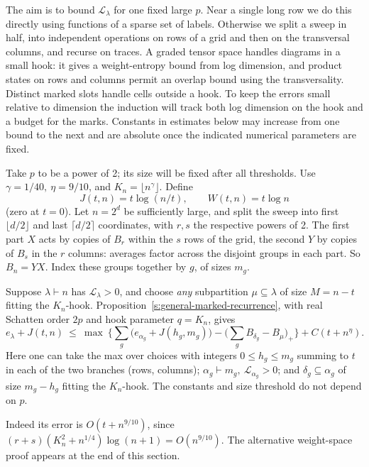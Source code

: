 The aim is to bound \(\mathcal L_\lambda\) for one fixed large \(p\). Near a single long row we do this directly using functions of a sparse set of labels. Otherwise we split a sweep in half, into independent operations on rows of a grid and then on the transversal columns, and recurse on traces. A graded tensor space handles diagrams in a small hook: it gives a weight-entropy bound from log dimension, and product states on rows and columns permit an overlap bound using the transversality. Distinct marked slots handle cells outside a hook. To keep the errors small relative to dimension the induction will track both log dimension on the hook and a budget for the marks. Constants in estimates below may increase from one bound to the next and are absolute once the indicated numerical parameters are fixed.

Take \(p\) to be a power of 2; its size will be fixed after all thresholds. Use \(\gamma=1/40,\ \eta=9/10\), and \(K_n=\lfloor n^\gamma\rfloor\). Define
\[
 J(t,n)=t\log(n/t),\qquad W(t,n)=t\log n
\]
(zero at \(t=0\)). Let \(n=2^d\) be sufficiently large, and split the sweep into first \(\lfloor d/2\rfloor\) and last \(\lceil d/2\rceil\) coordinates, with \(r,s\) the respective powers of 2. The first part \(X\) acts by copies of \(B_r\) within the \(s\) rows of the grid, the second \(Y\) by copies of \(B_s\) in the \(r\) columns: averages factor across the disjoint groups in each part. So \(B_n=YX\). Index these groups together by \(g\), of sizes \(m_g\).

Suppose \(\lambda\vdash n\) has \(\mathcal L_\lambda>0\), and choose \emph{any} subpartition \(\mu\subseteq\lambda\) of size \(M=n-t\) fitting the \(K_n\)-hook. Proposition~\ref{s:general-marked-recurrence}, with real Schatten order $2p$
and hook parameter $q=K_n$, gives
\begin{equation}
 e_\lambda+J(t,n)
 \ \le\ \max\ \Big\{
 \sum_g \big(e_{\alpha_g}+J(h_g,m_g)\big)
 -\big(\sum_g B_{\delta_g}-B_\mu\big)_+ \Big\}+ C(t+n^\eta).           \label{ten:simultaneous:eq:6}
\end{equation}
Here one can take the max over choices with integers \(0\le h_g\le m_g\) summing to \(t\) in each of the two branches (rows, columns);
\(\alpha_g\vdash m_g,\ \mathcal L_{\alpha_g}>0\); and \(\delta_g\subseteq\alpha_g\) of size \(m_g-h_g\) fitting the \(K_n\)-hook. The constants and size threshold do not depend on \(p\).


Indeed its error is $O(t+n^{9/10})$, since
$(r+s)(K_n^2+n^{1/4})\log(n+1)=O(n^{9/10})$.
The alternative weight-space proof appears at the end of this section.

